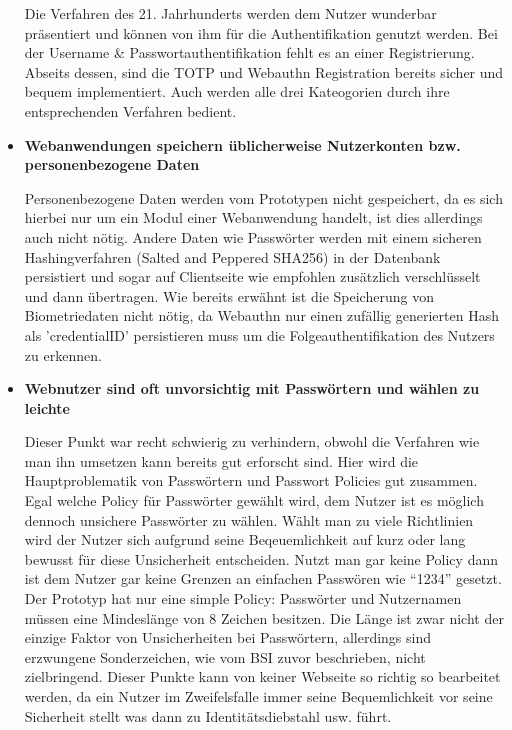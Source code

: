 \begin{itemize}
Die Verfahren des 21. Jahrhunderts werden dem Nutzer wunderbar präsentiert und können von ihm für die Authentifikation genutzt werden. Bei der Username \& Passwortauthentifikation fehlt es an einer Registrierung. Abseits dessen, sind die TOTP und Webauthn Registration bereits sicher und bequem implementiert. Auch werden alle drei Kateogorien durch ihre entsprechenden Verfahren bedient.

\item \textbf{Webanwendungen speichern üblicherweise Nutzerkonten bzw. personenbezogene Daten}

Personenbezogene Daten werden vom Prototypen nicht gespeichert, da es sich hierbei nur um ein Modul einer Webanwendung handelt, ist dies allerdings auch nicht nötig. Andere Daten wie Passwörter werden mit einem sicheren Hashingverfahren (Salted and Peppered SHA256) in der Datenbank persistiert und sogar auf Clientseite wie empfohlen zusätzlich verschlüsselt und dann übertragen. Wie bereits erwähnt ist die Speicherung von Biometriedaten nicht nötig, da Webauthn nur einen zufällig generierten Hash als 'credentialID' persistieren muss um die Folgeauthentifikation des Nutzers zu erkennen.

\item \textbf{Webnutzer sind oft unvorsichtig mit Passwörtern und wählen zu leichte}

Dieser Punkt war recht schwierig zu verhindern, obwohl die Verfahren wie man ihn umsetzen kann bereits gut erforscht sind. Hier wird die Hauptproblematik von Passwörtern und Passwort Policies gut zusammen. Egal welche Policy für Passwörter gewählt wird, dem Nutzer ist es möglich dennoch unsichere Passwörter zu wählen. Wählt man zu viele Richtlinien wird der Nutzer sich aufgrund seine Beqeuemlichkeit auf kurz oder lang bewusst für diese Unsicherheit entscheiden. Nutzt man gar keine Policy dann ist dem Nutzer gar keine Grenzen an einfachen Passwören wie ``1234'' gesetzt. Der Prototyp hat nur eine simple Policy: Passwörter und Nutzernamen müssen eine Mindeslänge von 8 Zeichen besitzen. Die Länge ist zwar nicht der einzige Faktor von Unsicherheiten bei Passwörtern, allerdings sind erzwungene Sonderzeichen, wie vom BSI zuvor beschrieben, nicht zielbringend. Dieser Punkte kann von keiner Webseite so richtig so bearbeitet werden, da ein Nutzer im Zweifelsfalle immer seine Bequemlichkeit vor seine Sicherheit stellt was dann zu Identitätsdiebstahl usw. führt.
\end{itemize}


